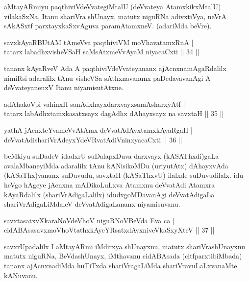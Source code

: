 \begin{artha}
aMtayARmiyu paqthiviVdeVvategiMtalU (deVvateya AtamxkikxMtalU) vilakaSxNa, Itanu shariVra shUnayx, matutx niguRNa adivxtiVya, neVrA  sAkASxtf parxtayxkaSxvAguva paramAtamxneV. (adariMda beVre).
\end{artha}

\begin{shl}
savxkAyaRBUtAM tAmeVva paqthiviVM moVhavatamxRnA |\\
tatarx labadhxvisheVSaH saMsAtxmeVvAyaM niyacaCxti \hfill || 34 ||
\end{shl}

\begin{artha}%
tananx kAyaRveV Ada A paqthiviVdeVvateyananx ajAcnxnamAgaRdalilx nimiRsi adaralilx tAnu visheVSa sAthxnavanunx paDedavavanAgi A deVvateyanenxV Itanu niyamisutAtxne.
\end{artha}

\begin{shl}
adAhakoV\s pi vahinxH sanAdxhayxdarxvayxsamAsharxyAtf |\\
tatarx labAdhxtamxkasatxsayx dagAdhx dAhayxsayx na savxtaH \hfill || 35 ||
\end{shl}

\begin{shl}
yathA jAcnxteYvameVvA\s \s tAmx deVvatAdAyxtamxkAyaRgaH |\\
deVvatAdishariVrAdeyxYdeVRvatAdiVninxyacaCxti \hfill || 36 ||
\end{shl}

\begin{artha}
beMkiyu suDadeV idadxrU suDalapxDuva darxvayx (kASAThxdi)gaLa avalaMbane\-yiMda adaralilx tAnu kANisikoMDu (uriyutAtx) dAhayxvAda (kASaThx)vanunx suDuvudu, savxtaH (kASaThxvU) ilalxde suDuvudilalx. idu heVgo hAgeye jAcnxna mADikoLuLxva Atamxnu deVvatAdi Atamxra kAyaRdalilx (shariVrAdigaLalilx) idudxgoMDavanAgi deVvatA\-digaLa shariVrAdigaLiMdaleV deVvatAdigaLanunx niyamisuvanu.
\end{artha}


\begin{shl}
savxtasatxvXkaraNoV\s deVhoV niguRNoV\s BeVda Eva ca |\\
cidABAsasavxmoVhoVtathxkAyeYRsatxdAvxniveVkaSxyXteV \hfill || 37 ||
\end{shl}

\begin{artha}
savxrUpadalilx I aMtayARmi iMdirxya shUnayxnu, matutx shariVrashUnayxnu matutx niguRNa, BeVdashUnayx, iMthavanu cidABAsada  (citfparxtibiMbada) tananx ajAcnxnadiMda huTiTxda shariVragaLiMda shariVravuLaLxvanaMte kANuvanu.
\end{artha}

